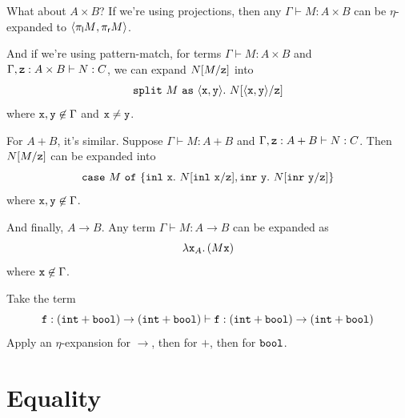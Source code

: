 \documentclass[runningheads,12pt]{llncs}
\newcommand{\ttspof}{\ \mathtt{as}\ }
\newcommand{\projl}{\pi_{\mathsf{l}}}
\newcommand{\projr}{\pi_{\mathsf{r}}}
\begin{document}

What about $A \times B$?  If we're using projections, then any $\Gamma \vdash M : A \times B$ can be $\eta$-expanded to $\pair{\projl M}{\projr M}$.  

And if we're using pattern-match, for terms $\Gamma \vdash M:A \times B$ and $\Gamma, \mathtt{z}:A \times B \vdash N : C$, we can expand $N[M/\mathtt{z}]$ into 
\begin{displaymath}
  \ttsplit M \ttspof \pair{\ttx}{\tty}.\ N[\pair{\ttx}{\tty}/\ttz]
\end{displaymath}
where $\mathtt{x},\mathtt{y} \not\in \Gamma$ and $\mathtt{x} \not= \mathtt{y}$.

For $A + B$, it's similar.  Suppose $\Gamma \vdash M:A+B$ and $\Gamma, \mathtt{z}:A+B  \vdash N : C$.  Then $N[M/\mathtt{z}]$ can be expanded into
\begin{displaymath}
  \ttcase M \ttof \{ \tttagl{\ttx}.\ N[\tttagl{\ttx}/\ttz], \tttagr{\tty}.\ N[\tttagr{\tty}/\ttz] \}
\end{displaymath}
where $\mathtt{x},\mathtt{y} \not\in\Gamma$.

And finally, $A \rightarrow B$.  Any term $\Gamma \vdash M : A \rightarrow B$ can be expanded as
\begin{displaymath}
\lambda \mathtt{x}_{A}.\, (M \mathtt{x})
\end{displaymath}
where $\mathtt{x} \not\in \Gamma$.

\begin{exercise}
  Take the term
  \begin{displaymath}
    \mathtt{f}: (\mathtt{int} + \mathtt{bool}) \rightarrow (\mathtt{int} + \mathtt{bool}) \vdash     \mathtt{f}: (\mathtt{int} + \mathtt{bool}) \rightarrow (\mathtt{int} + \mathtt{bool})
  \end{displaymath}
Apply an $\eta$-expansion for $\rightarrow$, then for $+$, then for $\mathtt{bool}$.
\end{exercise}





\section{Equality}
\end{document}

